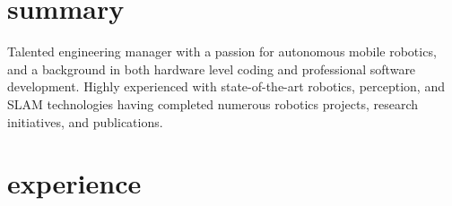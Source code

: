 \documentclass[stdletter]{friggeri-cv} %
\begin{document}
%    
%    

\section{summary}
\vspace{-0.1cm}
Talented engineering manager with a passion for autonomous mobile robotics, and a background in both hardware level coding and professional software development. Highly experienced with state-of-the-art robotics, perception, and SLAM technologies having completed numerous robotics projects, research initiatives, and publications.
\vspace{-0.2cm}


\section{experience}
\end{document}
